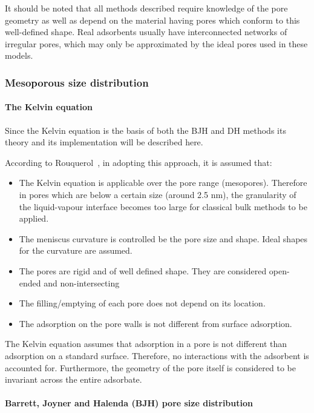 It should be noted that all methods described require knowledge of
the pore geometry as well as depend on the material having pores which
conform to this well-defined shape. Real adsorbents usually have interconnected
networks of irregular pores, which may only be approximated by the
ideal pores used in these models.

\subsubsection{Mesoporous size distribution}

\paragraph{The Kelvin equation}

Since the Kelvin equation is the basis of both the BJH and DH methods
its theory and its implementation will be described here.

According to Rouquerol~\cite{rouquerolAdsorptionPowdersPorous2013},
in adopting this approach, it is assumed that:

\begin{itemize}

	\item The Kelvin equation is applicable over the pore range (mesopores). Therefore
	      in pores which are below a certain size (around 2.5 nm), the granularity
	      of the liquid-vapour interface becomes too large for classical bulk methods
	      to be applied.
	\item The meniscus curvature is controlled be the pore size and shape. Ideal shapes
	      for the curvature are assumed.
	\item The pores are rigid and of well defined shape. They are considered
	      open-ended and non-intersecting
	\item The filling/emptying of each pore does not depend on its location.
	\item The adsorption on the pore walls is not different from surface adsorption.

\end{itemize}

The Kelvin equation assumes that adsorption in a pore is not different than adsorption
on a standard surface. Therefore, no interactions with the adsorbent is accounted for.
Furthermore, the geometry of the pore itself is considered to be invariant across the
entire adsorbate.

\paragraph{Barrett, Joyner and Halenda (BJH) pore size distribution}

